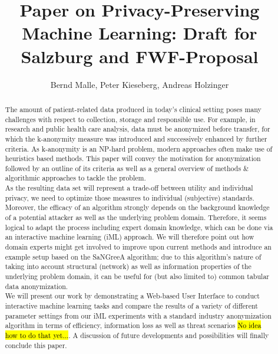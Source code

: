 \documentclass{llncs}
\begin{document}
\title{Paper on Privacy-Preserving Machine Learning:  \protect\newline
Draft for Salzburg and FWF-Proposal}

\author{Bernd Malle, Peter Kieseberg, Andreas Holzinger}

\maketitle

\begin{abstract}
	
The amount of patient-related data produced in today’s clinical setting poses many challenges with respect to collection, storage and responsible use. For example, in research and public health care analysis, data must be anonymized before transfer, for which the k-anonymity measure was introduced and successively enhanced by further criteria. As k-anonymity is an NP-hard problem, modern approaches often make use of heuristics based methods. This paper will convey the motivation for anonymization followed by an outline of its criteria as well as a general overview of methods \& algorithmic approaches to tackle the problem. \\

As the resulting data set will represent a trade-off between utility and individual privacy, we need to optimize those measures to individual (subjective) standards. Moreover, the efficacy of an algorithm strongly depends on the background knowledge of a potential attacker as well as the underlying problem domain. Therefore, it seems logical to adapt the process including expert domain knowledge, which can be done via an interactive machine learning (iML) approach. We will therefore point out how domain experts might get involved to improve upon current methods and introduce an example setup based on the SaNGreeA algorithm; due to this algorithm's nature of taking into account structural (network) as well as information properties of the underlying problem domain, it can be useful for (but also limited to) common tabular data anonymization. \\

We will present our work by demonstrating a Web-based User Interface to conduct interactive machine learning tasks and compare the results of a variety of different parameter settings from our iML experiments with a standard industry anonymization algorithm in terms of efficiency, information loss as well as threat scenarios \hl{No idea how to do that yet...}. A discussion of future developments and possibilities will finally conclude this paper.



\end{abstract}
\end{document}
